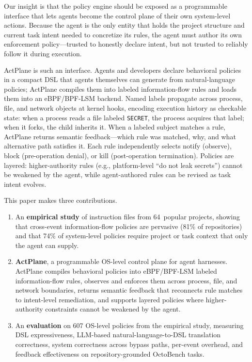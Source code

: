 Our insight is that the policy engine should be exposed as a
programmable interface that lets agents become the control plane of
their own system-level actions. Because the agent is the only entity
that holds the project structure and current task intent needed to
concretize its rules, the agent must author its own enforcement
policy---trusted to honestly declare intent, but not trusted to
reliably follow it during execution.

ActPlane is such an interface. Agents and developers declare behavioral
policies in a compact DSL that agents themselves can generate from
natural-language policies; ActPlane compiles them into labeled
information-flow rules and loads them into an eBPF/BPF-LSM backend. Named
labels propagate across process, file, and network objects at kernel hooks,
encoding execution history as checkable state: when a process reads a file
labeled \texttt{SECRET}, the process acquires that label; when it forks, the
child inherits it. When a labeled subject matches a rule, ActPlane returns
semantic feedback---which rule was matched, why, and what alternative path
satisfies it. Each rule independently selects notify (observe), block
(pre-operation denial), or kill (post-operation termination).
Policies are layered: higher-authority rules (e.g., platform-level
``do not leak secrets'') cannot be weakened by the agent, while
agent-authored rules can be revised as task intent evolves.


This paper makes three contributions.

\begin{enumerate}
\item An \textbf{empirical study} of instruction files from 64~popular
projects, showing that cross-event information-flow policies are pervasive
(81\% of repositories) and that 74\% of system-level policies require
project or task context that only the agent can supply.

\item \textbf{ActPlane}, a programmable OS-level control plane for agent
harnesses. ActPlane compiles behavioral policies into eBPF/BPF-LSM labeled
information-flow rules, observes and enforces them across process, file,
and network boundaries, returns semantic feedback that reconnects rule
matches to intent-level remediation, and supports layered policies where
higher-authority constraints cannot be weakened by the agent.

\item An \textbf{evaluation} on 607 OS-level policies from the
empirical study, measuring DSL expressiveness, LLM-based
natural-language-to-DSL translation correctness, system correctness
across bypass paths, per-event overhead, and feedback effectiveness on
repository-grounded OctoBench tasks.
\end{enumerate}

